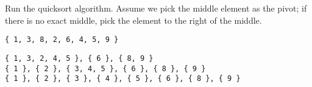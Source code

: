 \question Run the quicksort algorithm. Assume we pick the middle element as the pivot; if there is no exact middle, pick the element to the right of the middle.

\begin{verbatim}
{ 1, 3, 8, 2, 6, 4, 5, 9 }
\end{verbatim}

\begin{solution}[1in]
\begin{verbatim}
{ 1, 3, 2, 4, 5 }, { 6 }, { 8, 9 }
{ 1 }, { 2 }, { 3, 4, 5 }, { 6 }, { 8 }, { 9 }
{ 1 }, { 2 }, { 3 }, { 4 }, { 5 }, { 6 }, { 8 }, { 9 }
\end{verbatim}
\end{solution}